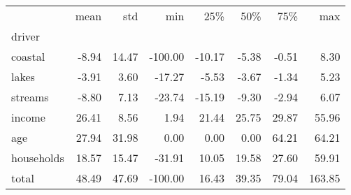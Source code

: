 \begin{tabular}{lrrrrrrr}
\toprule
 & mean & std & min & 25\% & 50\% & 75\% & max \\
driver &  &  &  &  &  &  &  \\
\midrule
coastal & -8.94 & 14.47 & -100.00 & -10.17 & -5.38 & -0.51 & 8.30 \\
lakes & -3.91 & 3.60 & -17.27 & -5.53 & -3.67 & -1.34 & 5.23 \\
streams & -8.80 & 7.13 & -23.74 & -15.19 & -9.30 & -2.94 & 6.07 \\
income & 26.41 & 8.56 & 1.94 & 21.44 & 25.75 & 29.87 & 55.96 \\
age & 27.94 & 31.98 & 0.00 & 0.00 & 0.00 & 64.21 & 64.21 \\
households & 18.57 & 15.47 & -31.91 & 10.05 & 19.58 & 27.60 & 59.91 \\
total & 48.49 & 47.69 & -100.00 & 16.43 & 39.35 & 79.04 & 163.85 \\
\bottomrule
\end{tabular}
